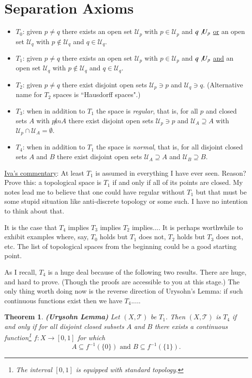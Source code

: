 \documentclass[11pt]{amsart}
\newtheorem{theorem}{Theorem}
\newcommand{\<}{\langle}
\renewcommand{\>}{\rangle}
\newcommand{\U}{\mathcal{U}}
\newcommand{\T}{\mathcal{T}}
\begin{document}
\section{Separation Axioms}

\begin{itemize}
\item $T_0$: given $p\neq q$ there exists an open set $\U_p$ with $p\in \U_p$ and $q\not \U_p$ \underline{or} an open set $\U_q$ with $p\not\in \U_q$ and $q\in \U_q$.
\medbreak
\item $T_1$: given $p\neq q$ there exists an open set $\U_p$ with $p\in \U_p$ and $q\not \U_p$ \underline{and} an open set $\U_q$ with $p\not\in \U_q$ and $q\in \U_q$.
\medbreak
\item $T_2$: given $p\neq q$ there exist disjoint open sets $\U_p\ni p$ and $\U_q\ni q$. (Alternative name for $T_2$ spaces is ``Hausdorff spaces".)
\medbreak
\item $T_3$: when in addition to $T_1$ the space is \emph{regular}, that is, for all $p$ and closed sets $A$ with $p\not in A$ there exist disjoint open sets $\U_p\ni p$ and $\U_A\supseteq A$ with $\U_p\cap \U_A=\emptyset$.
\medbreak
\item $T_4$: when in addition to $T_1$ the space is \emph{normal}, that is, for all disjoint closed sets $A$ and $B$ there exist disjoint open sets $\U_A\supseteq A$ and $\U_B\supseteq B$.
\end{itemize}

\underline{Iva's commentary}: At least $T_1$ is assumed in everything I have ever seen. Reason? Prove this: a topological space is $T_1$ if and only if all of its points are closed. My notes lead me to believe that one could have regular without $T_1$ but that must be some stupid situation like anti-discrete topology or some such. I have no intention to think about that. 

It is the case that $T_4$ implies $T_3$ implies $T_2$ implies.... It is perhaps worthwhile to exhibit examples where, say, $T_0$ holds but $T_1$ does not, $T_2$ holds but $T_3$ does not, etc. The list of topological spaces from the beginning could be a good starting point. 

As I recall, $T_4$ is a huge deal because of the following two results. There are huge, and hard to prove. (Though the proofs are accessible to you at this stage.) The only thing worth doing now is the reverse direction of Urysohn's Lemma: if such continuous functions exist then we have $T_4$.....

\begin{theorem}
{\bf (Urysohn Lemma)} Let $(X,\T)$ be $T_1$. Then $(X,\T)$ is $T_4$ if and only if for all disjoint closed subsets $A$ and $B$ there exists a continuous function\footnote{The interval $[0,1]$ is equipped with standard topology.} $f:X\to [0,1]$ for which 
$$A\subseteq f^{-1}(\{0\}) \text{\ \ and\ \ } B\subseteq f^{-1}(\{1\}).$$
\end{theorem}
\end{document}
